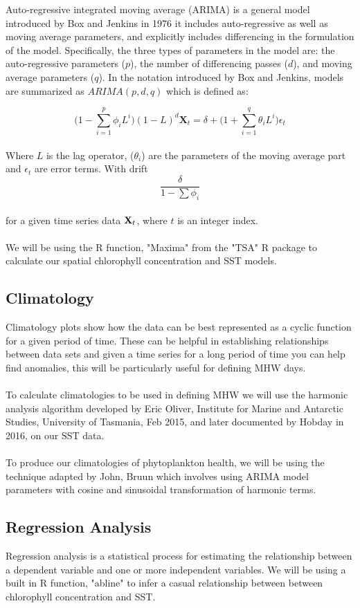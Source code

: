 Auto-regressive integrated moving average (ARIMA) is a general model introduced by Box and Jenkins in 1976 \cite{li1986fractional} it includes auto-regressive as well as moving average parameters, and explicitly includes differencing in the formulation of the model. Specifically, the three types of parameters in the model are: the auto-regressive parameters ($p$), the number of differencing passes ($d$), and moving average parameters ($q$). In the notation introduced by Box and Jenkins, models are summarized as $ARIMA(p,d,q)$ which is defined as:

\begin{equation*}
    \Big( 1 - \sum_{i=1}^p\phi_iL^i\Big)(1-L)^d\mathbf{X}_t = \delta + \Big(1+\sum_{i=1}^q\theta_i L^i\Big)\epsilon_t
\end{equation*}
\\
Where $L$ is the lag operator, ($\theta_i$) are the parameters of the moving average part and $\epsilon_t$ are error terms. With drift
\begin{equation*}
    \frac{\delta}{1-\sum\phi_i}
\end{equation*}
\\
for a given time series data $\bold{X}_t$, where $t$ is an integer index.
\\\\
We will be using the R function, "Maxima" from the "TSA" R package \cite{TSA} to calculate our spatial chlorophyll concentration and SST models.

\subsection{Climatology}

Climatology plots show how the data can be best represented as a cyclic function for a given period of time. These can be helpful in establishing relationships between data sets and given a time series for a long period of time you can help find anomalies, this will be particularly useful for defining MHW days.
\\\\
To calculate climatologies to be used in defining MHW we will use the harmonic analysis algorithm developed by Eric Oliver, Institute for Marine and Antarctic Studies, University of Tasmania, Feb 2015, and later documented by Hobday in 2016, \cite{hobday2016hierarchical} on our SST data.
\\\\
To produce our climatologies of phytoplankton health, we will be using the technique adapted by John, Bruun \cite{bruun2017heartbeat} which involves using ARIMA model parameters with cosine and sinusoidal transformation of harmonic terms.

\subsection{Regression Analysis}

Regression analysis is a statistical process for estimating the relationship between a dependent variable and one or more independent variables. We will be using a built in R function, "abline" to infer a casual relationship between between chlorophyll concentration and SST.